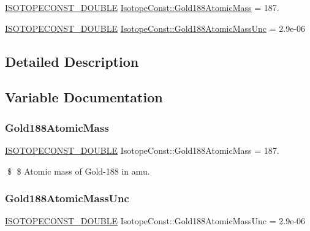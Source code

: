 \begin{DoxyCompactItemize}
\item 
\mbox{\hyperlink{group___isotope_const-_macros_ga8f45a7272ce02c0b4c65c44636ed719a}{I\+S\+O\+T\+O\+P\+E\+C\+O\+N\+S\+T\+\_\+\+D\+O\+U\+B\+LE}} \mbox{\hyperlink{group___isotope_const-_gold-_au188_gae8f8ef1a0e7aa54a48e47ed1229e8516}{Isotope\+Const\+::\+Gold188\+Atomic\+Mass}} = 187.
\item 
\mbox{\hyperlink{group___isotope_const-_macros_ga8f45a7272ce02c0b4c65c44636ed719a}{I\+S\+O\+T\+O\+P\+E\+C\+O\+N\+S\+T\+\_\+\+D\+O\+U\+B\+LE}} \mbox{\hyperlink{group___isotope_const-_gold-_au188_ga45542e23619ba8970294c1dca20f8663}{Isotope\+Const\+::\+Gold188\+Atomic\+Mass\+Unc}} = 2.\+9e-\/06
\end{DoxyCompactItemize}


\subsection{Detailed Description}


\subsection{Variable Documentation}
\mbox{\label{group___isotope_const-_gold-_au188_gae8f8ef1a0e7aa54a48e47ed1229e8516}} 
\subsubsection{\texorpdfstring{Gold188\+Atomic\+Mass}{Gold188AtomicMass}}
{\footnotesize\ttfamily \mbox{\hyperlink{group___isotope_const-_macros_ga8f45a7272ce02c0b4c65c44636ed719a}{I\+S\+O\+T\+O\+P\+E\+C\+O\+N\+S\+T\+\_\+\+D\+O\+U\+B\+LE}} Isotope\+Const\+::\+Gold188\+Atomic\+Mass = 187.}

\$ \$ Atomic mass of Gold-\/188 in amu. \mbox{\label{group___isotope_const-_gold-_au188_ga45542e23619ba8970294c1dca20f8663}} 
\subsubsection{\texorpdfstring{Gold188\+Atomic\+Mass\+Unc}{Gold188AtomicMassUnc}}
{\footnotesize\ttfamily \mbox{\hyperlink{group___isotope_const-_macros_ga8f45a7272ce02c0b4c65c44636ed719a}{I\+S\+O\+T\+O\+P\+E\+C\+O\+N\+S\+T\+\_\+\+D\+O\+U\+B\+LE}} Isotope\+Const\+::\+Gold188\+Atomic\+Mass\+Unc = 2.\+9e-\/06}

